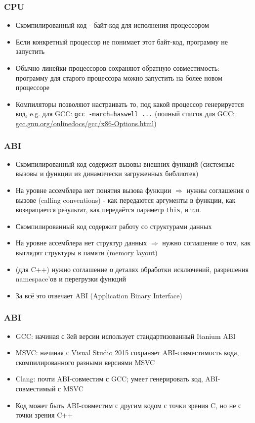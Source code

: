 \documentclass{beamer}
\begin{document}
\begin{frame}[fragile]
\frametitle{CPU}
\begin{itemize}
\item Скомпилированный код - байт-код для исполнения процессором
\pause
\item Если конкретный процессор не понимает этот байт-код, программу не запустить
\pause
\item Обычно линейки процессоров сохраняют обратную совместимость: программу для старого процессора можно запустить на более новом процессоре
\pause
\item Компиляторы позволяют настраивать то, под какой процессор генерируется код, e.g. для GCC: \verb|gcc -march=haswell ...| (полный список для GCC: \href{https://gcc.gnu.org/onlinedocs/gcc/x86-Options.html}{gcc.gnu.org/onlinedocs/gcc/x86-Options.html})
\end{itemize}
\end{frame}

\begin{frame}[fragile]
\frametitle{ABI}
\begin{itemize}
\item Скомпилированный код содержит вызовы внешних функций (системные вызовы и функции из динамически загруженных библиотек)
\pause
\item На уровне ассемблера нет понятия вызова функции \begin{math}\Rightarrow\end{math} нужны соглашения о вызове (calling conventions) - как передаются аргументы в функции, как возвращается результат, как передаётся параметр \verb|this|, и т.п.
\pause
\item Скомпилированный код содержит работу со структурами данных
\pause
\item На уровне ассемблера нет структур данных \begin{math}\Rightarrow\end{math} нужно соглашение о том, как выглядят структуры в памяти (memory layout)
\pause
\item (для C++) нужно соглашение о деталях обработки исключений, разрешения namespace'ов и перегрузки функций
\pause
\item За всё это отвечает ABI (Application Binary Interface)
\end{itemize}
\end{frame}

\begin{frame}[fragile]
\frametitle{ABI}
\begin{itemize}
\item GCC: начиная с 3ей версии использует стандартизованный Itanium ABI
\pause
\item MSVC: начиная с Visual Studio 2015 сохраняет ABI-совместимость кода, скомпилированного разными версиями MSVC
\pause
\item Clang: почти ABI-совместим с GCC; умеет генерировать код, ABI-совместимый с MSVC
\pause
\item Код может быть ABI-совместим с другим кодом с точки зрения C, но не с точки зрения C++
\end{itemize}
\end{frame}
\end{document}
